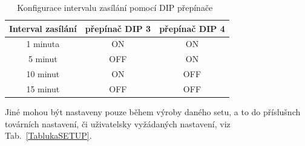 \newpage{}

\begin{table}[!ht]
\centering
\caption{Konfigurace intervalu zasílání pomocí DIP přepínače~\cite{CidloWeptech}}
\label{TablukaDIP}
\begin{tabular}{|c|c|c|}
\hline
\textbf{Interval zasílání} & přepínač DIP 3 & přepínač DIP 4 \\ \hline \hline
1 minuta & ON & ON \\ \hline
5 minut & OFF & ON \\ \hline
10 minut & ON & OFF \\ \hline
15 minut & OFF & OFF \\ \hline \hline
\end{tabular}
\end{table}

Jiné mohou být nastaveny pouze během výroby daného setu, a to do příslušnch továrních nastavení, či uživatelsky vyžádaných nastavení, viz Tab.~\ref{TablukaSETUP}.

